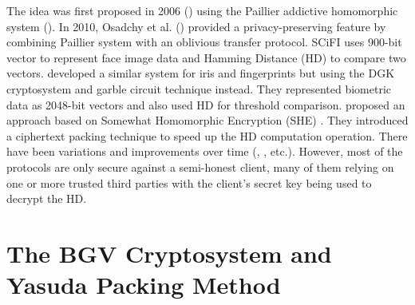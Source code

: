 The idea was first proposed in 2006 (\cite{schoenmakers2006efficient}) using the Paillier addictive homomorphic system
(\cite{paillier1999public}). In 2010, Osadchy et al. (\cite{osadchy2010scifi}) provided a privacy-preserving feature by
combining Paillier system with an oblivious transfer protocol. SCiFI uses 900-bit vector to represent face image data and
Hamming Distance (HD) to compare two vectors. \cite{blanton2011secure} developed a similar system for iris and
fingerprints but using the DGK cryptosystem \cite{damgard2008homomorphic} and garble circuit technique instead. They
represented biometric data as 2048-bit vectors and also used HD for threshold comparison. \cite{yasuda2014practical}
proposed an approach based on Somewhat Homomorphic Encryption (SHE) \cite{brakerski2011fully}. They introduced a
ciphertext packing technique to speed up the HD computation operation. There have been variations and improvements over
time (\cite{shahandashti2012private}, \cite{mandal2015comprehensive}, etc.). However, most of the protocols are only
secure against a semi-honest client, many of them relying on one or more trusted third parties with the client's secret key being used to decrypt the HD.



\section{The BGV Cryptosystem and Yasuda Packing Method}
\label{sec:firstProcBGV}

